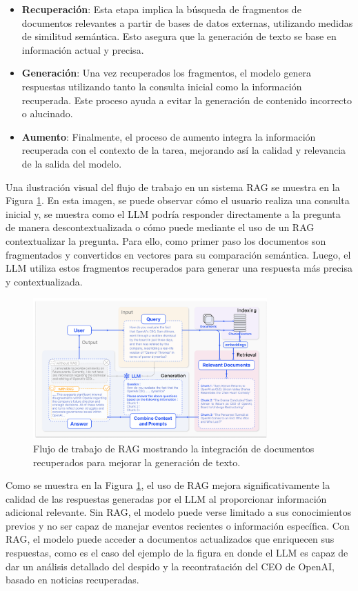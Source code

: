 \begin{itemize}
    \item \textbf{Recuperación}: Esta etapa implica la búsqueda de fragmentos de documentos relevantes a partir de bases de datos externas, utilizando medidas de similitud semántica. Esto asegura que la generación de texto se base en información actual y precisa.
    \item \textbf{Generación}: Una vez recuperados los fragmentos, el modelo genera respuestas utilizando tanto la consulta inicial como la información recuperada. Este proceso ayuda a evitar la generación de contenido incorrecto o alucinado.
    \item \textbf{Aumento}: Finalmente, el proceso de aumento integra la información recuperada con el contexto de la tarea, mejorando así la calidad y relevancia de la salida del modelo.
\end{itemize}

Una ilustración visual del flujo de trabajo en un sistema RAG se muestra en la Figura \ref{fig:rag}. En esta imagen, se puede observar cómo el usuario realiza una consulta inicial y, se muestra como el LLM podría responder directamente a la pregunta de manera descontextualizada o cómo puede mediante el uso de un RAG contextualizar la pregunta. Para ello, como primer paso los documentos son fragmentados y convertidos en vectores para su comparación semántica. Luego, el LLM utiliza estos fragmentos recuperados para generar una respuesta más precisa y contextualizada.

\begin{figure}[h]
    \centering
    \includegraphics[width=0.8\textwidth]{figuras/capitulo2/rag.png}
    \caption{Flujo de trabajo de RAG mostrando la integración de documentos recuperados para mejorar la generación de texto.}
    \label{fig:rag}
\end{figure}

Como se muestra en la Figura \ref{fig:rag}, el uso de RAG mejora significativamente la calidad de las respuestas generadas por el LLM al proporcionar información adicional relevante. Sin RAG, el modelo puede verse limitado a sus conocimientos previos y no ser capaz de manejar eventos recientes o información específica. Con RAG, el modelo puede acceder a documentos actualizados que enriquecen sus respuestas, como es el caso del ejemplo de la figura en donde el LLM es capaz de dar un análisis detallado del despido y la recontratación del CEO de OpenAI, basado en noticias recuperadas. 

